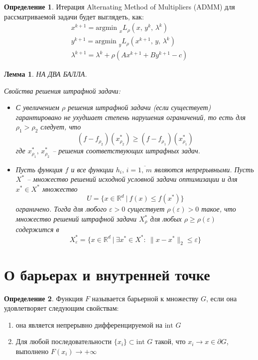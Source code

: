 \documentclass[a4paper,12pt]{article}
\renewcommand{\leq}{\ensuremath{\leqslant}}
\renewcommand{\geq}{\ensuremath{\geqslant}}
\theoremstyle{plain}
\newtheorem{lemma}{Лемма}[section]
\theoremstyle{definition}
\newtheorem{definition}{Определение}[section]
\theoremstyle{remark}
\begin{document}
\begin{definition}
  Итерация Alternating Method of Multipliers (ADMM) для рассматриваемой задачи будет выглядеть, как:
  \begin{align*}
    x^{k + 1} = \text{argmin }_x L_\rho(x,\, y^k,\, \lambda^k)\\
    y^{k + 1} = \text{argmin }_y L_\rho(x^{k + 1},\, y,\, \lambda^k)\\
    \lambda^{k + 1} = \lambda^k + \rho(Ax^{k + 1} + By^{k + 1} - c)
  \end{align*}
\end{definition}

\begin{lemma}
  НА ДВА БАЛЛА.

  Свойства решения штрафной задачи:
  \begin{itemize}
    \item С увеличением $\rho$ решения штрафной задачи (если существует) гарантировано не ухудшает степень нарушения ограничений, то есть для $\rho_1 > \rho_2$ следует, что
    \[
      (f - f_{\rho_2})(x^*_{\rho_2}) \geq (f - f_{\rho_1})(x^*_{\rho_1})
    \]
    где $x_{\rho_1}^*,\, x_{\rho_2}^*$ -- решения соответствующих штрафных задач.
    \item Пусть функция $f$ и все функции $h_i,\, i = \overline{1,\,m}$ являются непрерывными. Пусть $X^*$ -- множество решений исходной условной задачи оптимизации и для $x^* \in X^*$ множество
    \[
      U = \{x \in \mathbb{R}^d \:\vert\: f(x) \leq f(x^*)\}
    \]
    ограничено. Тогда для любого $\varepsilon > 0$ существует $\rho(\varepsilon) > 0$ такое, что множество решений штрафной задачи $X_\rho^*$ для любых $\rho \geq \rho(\varepsilon)$ содержится в
    \[
      X_\varepsilon^* = \{x \in \mathbb{R}^d \:\vert\: \exists x^* \in X^* :\: \|x - x^*\|_2 \leq \varepsilon\}
    \]
  \end{itemize}
\end{lemma}

\section{О барьерах и внутренней точке}
\begin{definition}
  Функция $F$ называется барьерной к множеству $G$, если она удовлетворяет следующим свойствам:
  \begin{enumerate}
    \item она является непрерывно дифференцируемой на $\text{int } G$
    \item Для любой последовательности $\{x_i\} \subset \text{int }G$ такой, что $x_i \to x \in \partial G$, выполнено $F(x_i) \to +\infty$
  \end{enumerate}
\end{definition}
\end{document}
